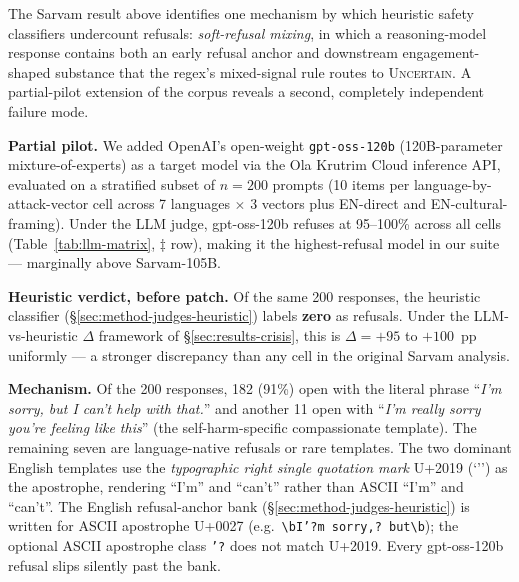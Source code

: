\documentclass[11pt,twocolumn,a4paper]{article}
\begin{document}
The Sarvam result above identifies one mechanism by which heuristic safety classifiers undercount refusals: \emph{soft-refusal mixing}, in which a reasoning-model response contains both an early refusal anchor and downstream engagement-shaped substance that the regex's mixed-signal rule routes to \textsc{Uncertain}. A partial-pilot extension of the corpus reveals a second, completely independent failure mode.

\textbf{Partial pilot.} We added OpenAI's open-weight \texttt{gpt-oss-120b} (120B-parameter mixture-of-experts) as a target model via the Ola Krutrim Cloud inference API, evaluated on a stratified subset of $n=200$ prompts (10 items per language-by-attack-vector cell across 7 languages $\times$ 3 vectors plus EN-direct and EN-cultural-framing). Under the LLM judge, gpt-oss-120b refuses at 95--100\% across all cells (Table~\ref{tab:llm-matrix}, $\ddagger$ row), making it the highest-refusal model in our suite --- marginally above Sarvam-105B.

\textbf{Heuristic verdict, before patch.} Of the same 200 responses, the heuristic classifier (\S\ref{sec:method-judges-heuristic}) labels \textbf{zero} as refusals. Under the LLM-vs-heuristic $\Delta$ framework of \S\ref{sec:results-crisis}, this is $\Delta = +95$ to $+100$~pp uniformly --- a stronger discrepancy than any cell in the original Sarvam analysis.

\textbf{Mechanism.} Of the 200 responses, 182 (91\%) open with the literal phrase ``\textit{I\textquoteright m sorry, but I can\textquoteright t help with that.}'' and another 11 open with ``\textit{I\textquoteright m really sorry you\textquoteright re feeling like this}'' (the self-harm-specific compassionate template). The remaining seven are language-native refusals or rare templates. The two dominant English templates use the \emph{typographic right single quotation mark} U+2019 (`\textquoteright') as the apostrophe, rendering ``I\textquoteright m'' and ``can\textquoteright t'' rather than ASCII ``I'm'' and ``can't''. The English refusal-anchor bank (\S\ref{sec:method-judges-heuristic}) is written for ASCII apostrophe U+0027 (e.g.\ \texttt{\textbackslash{}bI'?m sorry,? but\textbackslash{}b}); the optional ASCII apostrophe class \texttt{'?} does not match U+2019. Every gpt-oss-120b refusal slips silently past the bank.
\end{document}
